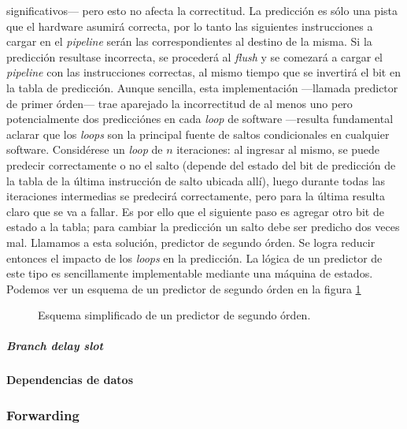 significativos--- pero esto no afecta la correctitud. La predicción es sólo una 
pista que el hardware asumirá correcta, por lo tanto las siguientes 
instrucciones a cargar en el \emph{pipeline} serán las correspondientes al 
destino de la misma. Si la predicción resultase incorrecta, se procederá al 
\emph{flush} y se comezará a cargar el \emph{pipeline} con las instrucciones 
correctas, al mismo tiempo que se invertirá el bit en la tabla de predicción. 
Aunque sencilla, esta implementación ---llamada predictor de primer 
órden--- trae aparejado la incorrectitud de al menos uno pero potencialmente dos 
predicciónes en cada \emph{loop} de software ---resulta fundamental aclarar que 
los \emph{loops} son la principal fuente de saltos condicionales en cualquier 
software. Considérese un \emph{loop} de $n$ iteraciones: al ingresar al mismo, 
se puede predecir correctamente o no el salto (depende del estado del bit de 
predicción de la tabla de la última instrucción de salto ubicada allí), luego 
durante todas las iteraciones intermedias se predecirá correctamente, pero para 
la última resulta claro que se va a fallar. Es por ello que el siguiente paso es 
agregar otro bit de estado a la tabla; para cambiar la predicción un salto debe 
ser predicho dos veces mal. Llamamos a esta solución, predictor de segundo 
órden. Se logra reducir entonces el impacto de los \emph{loops} en la 
predicción. La lógica de un predictor de este tipo es sencillamente 
implementable mediante una máquina de estados. Podemos ver un esquema de un 
predictor de segundo órden en la figura \ref{fig:C02-second_order_predictor}

\begin{figure}
  \centering
  
  \captionsetup{justification=centering}
  \caption{Esquema simplificado de un predictor de segundo órden.}
  \label{fig:C02-second_order_predictor}
\end{figure}


\subparagraph{Branch delay slot}

\paragraph{Dependencias de datos}
\label{par:optimizations-ilp-pipeline-data_dependencies}


\subsubsection{Forwarding}
\label{subsubsec:optimizations-ilp-forwarding}

